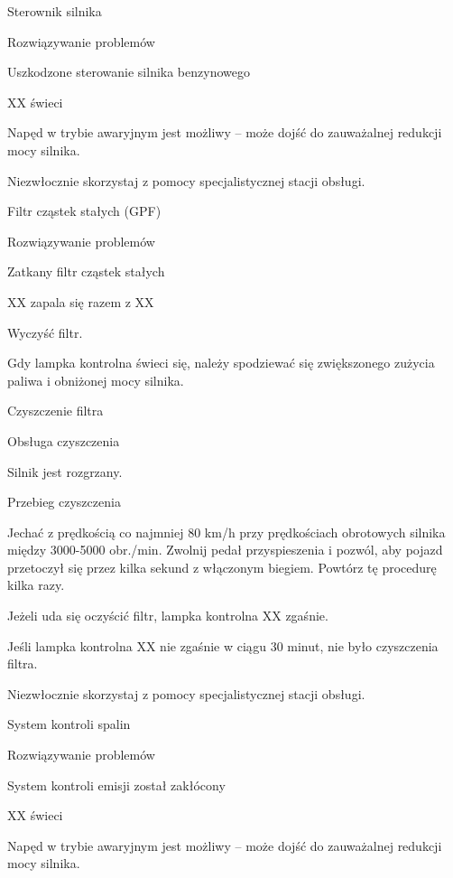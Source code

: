 Sterownik silnika

Rozwiązywanie problemów

Uszkodzone sterowanie silnika benzynowego

XX świeci

Napęd w trybie awaryjnym jest możliwy -- może dojść do zauważalnej redukcji mocy silnika.

\begin{itemizeArrow}
	\itemArrow Niezwłocznie skorzystaj z pomocy specjalistycznej stacji obsługi.
\end{itemizeArrow}

Filtr cząstek stałych (GPF)

Rozwiązywanie problemów

Zatkany filtr cząstek stałych

XX zapala się razem z XX
\begin{itemizeArrow}
	\itemArrow Wyczyść filtr.
\end{itemizeArrow}
Gdy lampka kontrolna świeci się, należy spodziewać się zwiększonego zużycia paliwa i obniżonej mocy silnika.

Czyszczenie filtra

Obsługa czyszczenia
\begin{itemizeTick}
	\itemTick Silnik jest rozgrzany.
\end{itemizeTick}

Przebieg czyszczenia
\begin{itemizeArrow}
	\itemArrow Jechać z prędkością co najmniej 80 km/h przy prędkościach obrotowych silnika między 3000-5000 obr./min.
	\itemArrow Zwolnij pedał przyspieszenia i pozwól, aby pojazd przetoczył się przez kilka sekund z włączonym biegiem.
	\itemArrow Powtórz tę procedurę kilka razy.
\end{itemizeArrow}

Jeżeli uda się oczyścić filtr, lampka kontrolna XX zgaśnie.

Jeśli lampka kontrolna XX nie zgaśnie w ciągu 30 minut, nie było czyszczenia filtra.
\begin{itemizeArrow}
	\itemArrow Niezwłocznie skorzystaj z pomocy specjalistycznej stacji obsługi.
\end{itemizeArrow}

System kontroli spalin

Rozwiązywanie problemów

System kontroli emisji został zakłócony

XX świeci

Napęd w trybie awaryjnym jest możliwy -- może dojść do zauważalnej redukcji mocy silnika.

